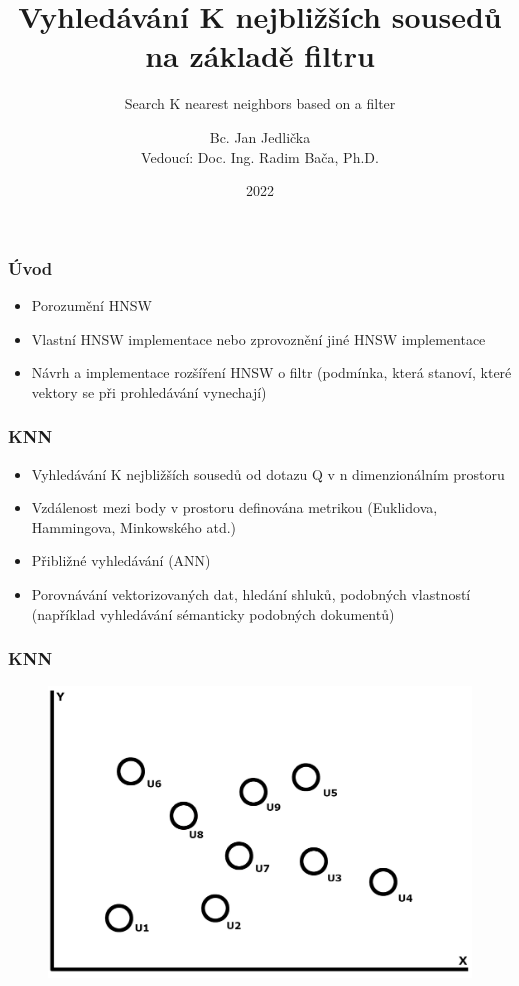 \documentclass{beamer}
\title[Semestrální práce]{Vyhledávání K nejbližších sousedů na základě filtru}
\subtitle{Search K nearest neighbors based on a filter}
\author[Bc. Jan Jedlička, JED0050]{Bc. Jan Jedlička \\ {\footnotesize Vedoucí: Doc. Ing. Radim Bača, Ph.D.}}
\institute[]{FEI, VŠB-TUO}
\date{2022}
\begin{document}
	
	\frame{\titlepage}
	
	\begin{frame}
		\frametitle{Úvod}
		
		\begin{itemize}
			\item Porozumění HNSW
			\item Vlastní HNSW implementace nebo zprovoznění jiné HNSW implementace
			\item Návrh a implementace rozšíření HNSW o filtr (podmínka, která stanoví, které vektory se při prohledávání vynechají)
		\end{itemize}
		
	\end{frame}

	\begin{frame}
		\frametitle{KNN}
		
		\begin{itemize}
			\item Vyhledávání K nejbližších sousedů od dotazu Q v n dimenzionálním prostoru
			\item Vzdálenost mezi body v prostoru definována metrikou (Euklidova, Hammingova, Minkowského atd.)
			\item Přibližné vyhledávání (ANN)
			\item Porovnávání vektorizovaných dat, hledání shluků, podobných vlastností (například vyhledávání sémanticky podobných dokumentů)
		\end{itemize}
		
	\end{frame}

	\begin{frame}
		\frametitle{KNN}
		\begin{figure}
			\includegraphics[scale=0.2]{figures/KNN_b1.jpg}
		\end{figure}
	\end{frame}
	
\end{document}
